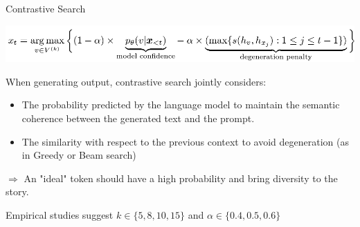 
\begin{frame}{Contrastive Search}

\begin{center}
    \includegraphics[width=1.0\linewidth]{figure/contrastive_search.png}
\end{center}     

When generating output, contrastive search jointly considers:
\begin{itemize}
    \item The probability predicted by the language model to maintain the semantic coherence between the generated text and the prompt.
    \item The similarity with respect to the previous context to avoid  degeneration (as in Greedy or Beam search)
\end{itemize}
   
$\Rightarrow$ An "ideal" token should have a high probability and bring diversity to the story.

Empirical studies suggest $k \in \{5, 8, 10, 15\}$ and $\alpha \in \{0.4, 0.5, 0.6\}$   

\vfill

\end{frame}


\endlecture
